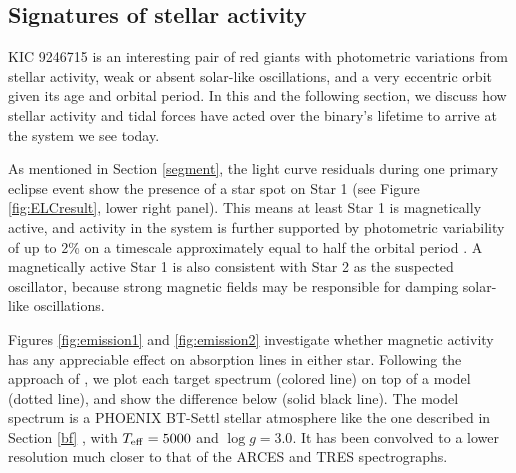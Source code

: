 \subsection{Signatures of stellar activity}\label{actrot}
KIC 9246715 is an interesting pair of red giants with photometric variations from stellar activity, weak or absent solar-like oscillations, and a very eccentric orbit given its age and orbital period. In this and the following section, we discuss how stellar activity and tidal forces have acted over the binary's lifetime to arrive at the system we see today.

As mentioned in Section \ref{segment}, the light curve residuals during one primary eclipse event show the presence of a star spot on Star 1 (see Figure \ref{fig:ELCresult}, lower right panel). This means at least Star 1 is magnetically active, and activity in the system is further supported by photometric variability of up to 2\% on a timescale approximately equal to half the orbital period \citep{gau14}. A magnetically active Star 1 is also consistent with Star 2 as the suspected oscillator, because strong magnetic fields may be responsible for damping solar-like oscillations.

Figures \ref{fig:emission1} and \ref{fig:emission2} investigate whether magnetic activity has any appreciable effect on absorption lines in either star. Following the approach of \citet{fro12}, we plot each target spectrum (colored line) on top of a model (dotted line), and show the difference below (solid black line). The model spectrum is a PHOENIX BT-Settl stellar atmosphere like the one described in Section \ref{bf} \citep{all03,asp09}, with $T_{\rm{eff}} = 5000$ and $\log g = 3.0$. It has been convolved to a lower resolution much closer to that of the ARCES and TRES spectrographs.

